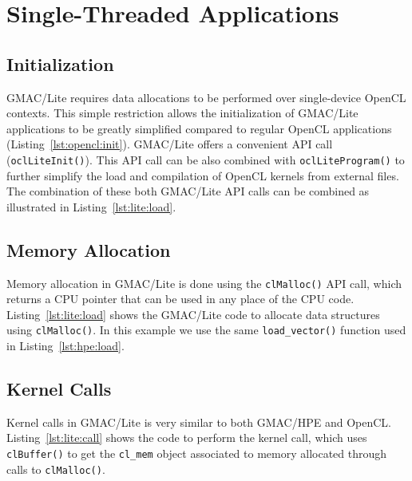 \section{Single\hyp{}Threaded Applications}

\subsection{Initialization}
GMAC\slash Lite requires data allocations to be performed over single\hyp{}device OpenCL contexts.  
This simple restriction allows the initialization of GMAC\slash Lite applications to be greatly 
simplified compared to regular OpenCL applications (Listing~\ref{lst:opencl:init}). GMAC\slash Lite 
offers a convenient API call (\texttt{oclLiteInit()}). This API call can be also combined with 
\texttt{oclLiteProgram()} to further simplify the load and compilation of OpenCL kernels from 
external files. The combination of these both GMAC\slash Lite API calls can be combined as 
illustrated in Listing~\ref{lst:lite:load}.




\subsection{Memory Allocation}
Memory allocation in GMAC\slash Lite is done using the \texttt{clMalloc()} API call, which returns a 
CPU pointer that can be used in any place of the CPU code. Listing~\ref{lst:lite:load} shows the 
GMAC\slash Lite code to allocate data structures using \texttt{clMalloc()}. In this example we use 
the same \texttt{load\_vector()} function used in Listing~\ref{lst:hpe:load}.



\subsection{Kernel Calls}
Kernel calls in GMAC\slash Lite is very similar to both GMAC\slash HPE and OpenCL\@.  
Listing~\ref{lst:lite:call} shows the code to perform the kernel call, which uses 
\texttt{clBuffer()} to get the \texttt{cl\_mem} object associated to memory allocated through calls 
to \texttt{clMalloc()}.

